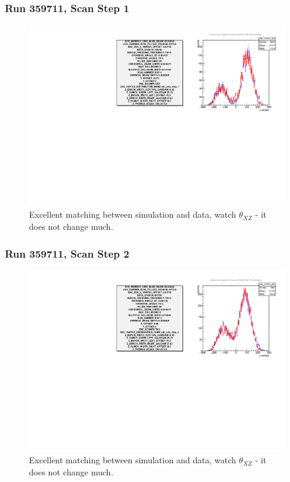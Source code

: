 \begin{frame}
\frametitle{Run 359711, Scan Step 1}
\begin{figure}
\begin{center}
\includegraphics[width=\linewidth]{"figs/359711_step_1_zdc_zvertex"}
\caption{Excellent matching between simulation and data, watch $\theta_{XZ}$ - it does not change much.}
\label{fig:359711_step_1_zdc_zvertex}
\end{center}\end{figure}
\end{frame}

\begin{frame}
\frametitle{Run 359711, Scan Step 2}
\begin{figure}
\begin{center}
\includegraphics[width=\linewidth]{"figs/359711_step_2_zdc_zvertex"}
\caption{Excellent matching between simulation and data, watch $\theta_{XZ}$ - it does not change much.}
\label{fig:359711_step_2_zdc_zvertex}
\end{center}\end{figure}
\end{frame}

